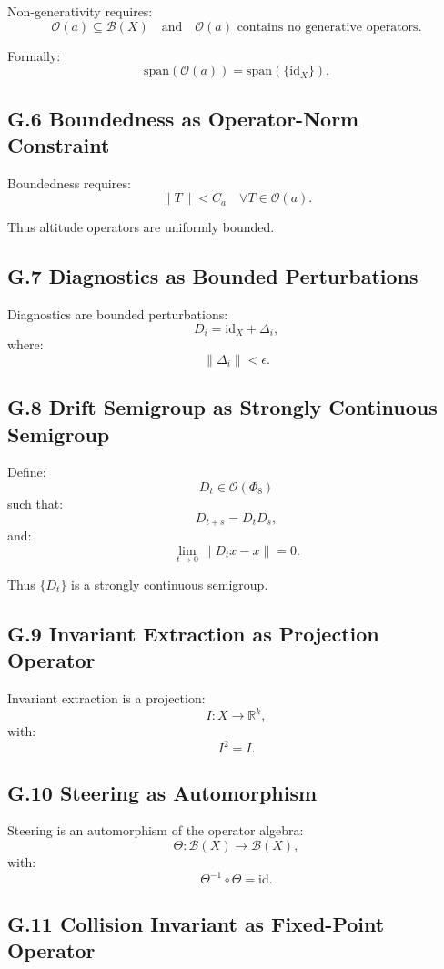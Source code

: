 Non-generativity requires:
\[
\mathcal{O}(a) \subseteq \mathcal{B}(X)
\quad \text{and} \quad
\mathcal{O}(a) \text{ contains no generative operators}.
\]

Formally:
\[
\mathrm{span}(\mathcal{O}(a)) = \mathrm{span}(\{\mathrm{id}_X\}).
\]

\subsection*{G.6 Boundedness as Operator-Norm Constraint}

Boundedness requires:
\[
\|T\| < C_a \quad \forall T \in \mathcal{O}(a).
\]

Thus altitude operators are uniformly bounded.

\subsection*{G.7 Diagnostics as Bounded Perturbations}

Diagnostics are bounded perturbations:
\[
D_i = \mathrm{id}_X + \Delta_i,
\]
where:
\[
\|\Delta_i\| < \epsilon.
\]

\subsection*{G.8 Drift Semigroup as Strongly Continuous Semigroup}

Define:
\[
D_t \in \mathcal{O}(\Phi_8)
\]
such that:
\[
D_{t+s}=D_t D_s,
\]
and:
\[
\lim_{t\to 0} \|D_t x - x\| = 0.
\]

Thus $\{D_t\}$ is a strongly continuous semigroup.

\subsection*{G.9 Invariant Extraction as Projection Operator}

Invariant extraction is a projection:
\[
I : X \to \mathbb{R}^k,
\]
with:
\[
I^2 = I.
\]

\subsection*{G.10 Steering as Automorphism}

Steering is an automorphism of the operator algebra:
\[
\Theta : \mathcal{B}(X) \to \mathcal{B}(X),
\]
with:
\[
\Theta^{-1} \circ \Theta = \mathrm{id}.
\]

\subsection*{G.11 Collision Invariant as Fixed-Point Operator}


